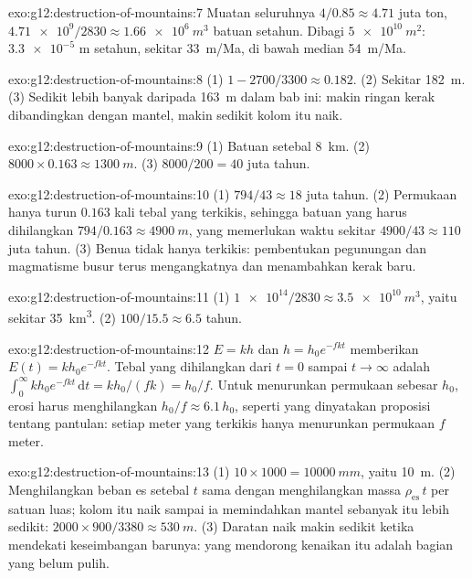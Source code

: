 \begin{solution}{exo:g12:destruction-of-mountains:7}
Muatan seluruhnya $4/0.85 \approx 4.71$ juta ton, $\num{4.71e9}/2830 \approx
\qty{1.66e6}{m^3}$ batuan setahun. Dibagi $\qty{5e10}{m^2}$: $\num{3.3e-5}$ m
setahun, sekitar \qty{33}{m/Ma}, di bawah median \qty{54}{m/Ma}.
\end{solution}

\begin{solution}{exo:g12:destruction-of-mountains:8}
(1) $1 - 2700/3300 \approx 0.182$. (2) Sekitar \qty{182}{m}. (3) Sedikit lebih
banyak daripada \qty{163}{m} dalam bab ini: makin ringan kerak dibandingkan
dengan mantel, makin sedikit kolom itu naik.
\end{solution}

\begin{solution}{exo:g12:destruction-of-mountains:9}
(1) Batuan setebal \qty{8}{km}. (2) $8000 \times 0.163 \approx \qty{1300}{m}$.
(3) $8000/200 = 40$ juta tahun.
\end{solution}

\begin{solution}{exo:g12:destruction-of-mountains:10}
(1) $794/43 \approx 18$ juta tahun. (2) Permukaan hanya turun
$0.163$ kali tebal yang terkikis, sehingga batuan yang harus dihilangkan $794/0.163
\approx \qty{4900}{m}$, yang memerlukan waktu sekitar $4900/43 \approx 110$ juta
tahun. (3) Benua tidak hanya terkikis: pembentukan pegunungan dan magmatisme
busur terus mengangkatnya dan menambahkan kerak baru.
\end{solution}

\begin{solution}{exo:g12:destruction-of-mountains:11}
(1) $\num{1e14}/2830 \approx \qty{3.5e10}{m^3}$, yaitu sekitar
\qty{35}{km^3}. (2) $100/15.5 \approx 6.5$ tahun.
\end{solution}

\begin{solution}{exo:g12:destruction-of-mountains:12}
$E = kh$ dan $h = h_0 e^{-fkt}$ memberikan $E(t) = kh_0 e^{-fkt}$. Tebal yang
dihilangkan dari $t = 0$ sampai $t \to \infty$ adalah $\int_0^{\infty} kh_0
e^{-fkt}\,\mathrm{d}t = kh_0/(fk) = h_0/f$. Untuk menurunkan permukaan sebesar
$h_0$, erosi harus menghilangkan $h_0/f \approx 6.1\,h_0$, seperti yang
dinyatakan proposisi tentang pantulan: setiap meter yang terkikis hanya
menurunkan permukaan $f$ meter.
\end{solution}

\begin{solution}{exo:g12:destruction-of-mountains:13}
(1) $10 \times 1000 = \qty{10000}{mm}$, yaitu \qty{10}{m}. (2) Menghilangkan
beban es setebal $t$ sama dengan menghilangkan massa $\rho_{\text{es}}\,t$ per
satuan luas; kolom itu naik sampai ia memindahkan mantel sebanyak itu lebih sedikit:
$2000 \times 900/3380 \approx \qty{530}{m}$. (3) Daratan naik makin sedikit
ketika mendekati keseimbangan barunya: yang mendorong kenaikan itu adalah bagian
yang belum pulih.
\end{solution}

